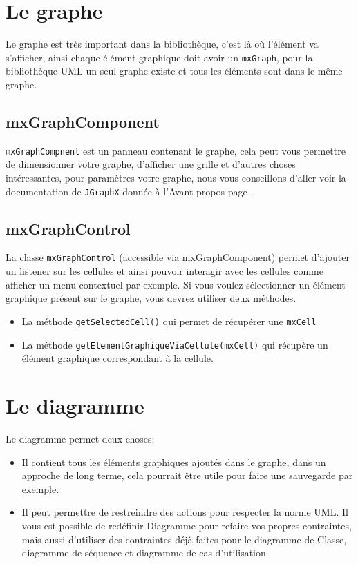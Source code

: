 \documentclass[12pt,a4paper,oneside]{book}
\begin{document}
	\section{Le graphe} \label{mxGraph}
	Le graphe est très important dans la bibliothèque, c'est là où l'élément va s'afficher, ainsi chaque élément graphique doit avoir un \texttt{mxGraph}, pour la bibliothèque
	UML un seul graphe existe et tous les éléments sont dans le même graphe.
	\subsection{mxGraphComponent}
	\texttt{mxGraphCompnent} est un panneau contenant le graphe, cela peut vous permettre de dimensionner votre graphe, d'afficher une grille et d'autres choses
	intéressantes, pour paramètres votre graphe, nous vous conseillons d'aller voir la documentation de \texttt{JGraphX} donnée à l'Avant-propos page \pageref{docDemonstrateur}.
	\subsection{mxGraphControl}
	La classe \texttt{mxGraphControl} (accessible via mxGraphComponent) permet d'ajouter un listener sur les cellules et ainsi pouvoir interagir avec les cellules comme
	afficher un menu contextuel par exemple. Si vous voulez sélectionner un élément graphique présent sur le graphe, vous devrez utiliser deux méthodes. 
	\begin{itemize}
		\item La méthode \texttt{getSelectedCell()} qui permet de récupérer une \texttt{mxCell}
		\item La méthode \texttt{getElementGraphiqueViaCellule(mxCell)} qui récupère un élément graphique correspondant à la cellule.
	\end{itemize}
	\section{Le diagramme}
	Le diagramme permet deux choses:
	\begin{itemize}
		\item Il contient tous les éléments graphiques ajoutés dans le graphe, dans un approche de long terme, cela pourrait être utile pour faire une sauvegarde par exemple.
		\item Il peut permettre de restreindre des actions pour respecter la norme UML. Il vous est possible de redéfinir Diagramme pour refaire vos propres contraintes, 
			mais aussi d'utiliser des contraintes déjà faites pour le diagramme de Classe, diagramme de séquence et diagramme de cas d'utilisation.
	\end{itemize}
\end{document}
